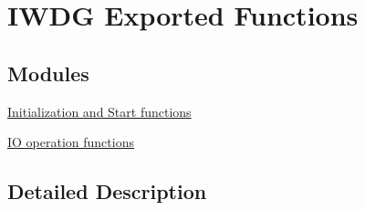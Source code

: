 \hypertarget{group___i_w_d_g___exported___functions}{}\section{I\+W\+DG Exported Functions}
\label{group___i_w_d_g___exported___functions}
\subsection*{Modules}
\begin{DoxyCompactItemize}
\item 
\hyperlink{group___i_w_d_g___exported___functions___group1}{Initialization and Start functions}
\item 
\hyperlink{group___i_w_d_g___exported___functions___group2}{I\+O operation functions}
\end{DoxyCompactItemize}


\subsection{Detailed Description}
